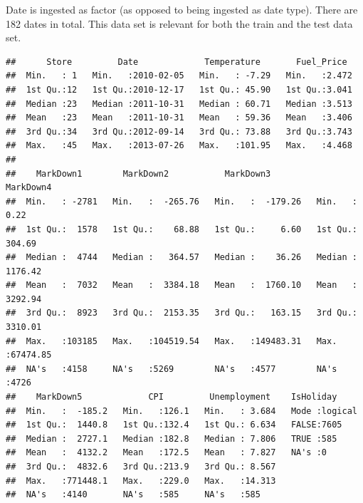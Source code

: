 \documentclass[]{article}
\newenvironment{Shaded}{\begin{snugshade}}{\end{snugshade}}
\newcommand{\KeywordTok}[1]{\textcolor[rgb]{0.13,0.29,0.53}{\textbf{{#1}}}}
\newcommand{\StringTok}[1]{\textcolor[rgb]{0.31,0.60,0.02}{{#1}}}
\newcommand{\NormalTok}[1]{{#1}}
\begin{document}
Date is ingested as factor (as opposed to being ingested as date type).
There are 182 dates in total. This data set is relevant for both the
train and the test data set.

\begin{Shaded}
\end{Shaded}

\begin{verbatim}
##      Store         Date             Temperature       Fuel_Price   
##  Min.   : 1   Min.   :2010-02-05   Min.   : -7.29   Min.   :2.472  
##  1st Qu.:12   1st Qu.:2010-12-17   1st Qu.: 45.90   1st Qu.:3.041  
##  Median :23   Median :2011-10-31   Median : 60.71   Median :3.513  
##  Mean   :23   Mean   :2011-10-31   Mean   : 59.36   Mean   :3.406  
##  3rd Qu.:34   3rd Qu.:2012-09-14   3rd Qu.: 73.88   3rd Qu.:3.743  
##  Max.   :45   Max.   :2013-07-26   Max.   :101.95   Max.   :4.468  
##                                                                    
##    MarkDown1        MarkDown2           MarkDown3           MarkDown4       
##  Min.   : -2781   Min.   :  -265.76   Min.   :  -179.26   Min.   :    0.22  
##  1st Qu.:  1578   1st Qu.:    68.88   1st Qu.:     6.60   1st Qu.:  304.69  
##  Median :  4744   Median :   364.57   Median :    36.26   Median : 1176.42  
##  Mean   :  7032   Mean   :  3384.18   Mean   :  1760.10   Mean   : 3292.94  
##  3rd Qu.:  8923   3rd Qu.:  2153.35   3rd Qu.:   163.15   3rd Qu.: 3310.01  
##  Max.   :103185   Max.   :104519.54   Max.   :149483.31   Max.   :67474.85  
##  NA's   :4158     NA's   :5269        NA's   :4577        NA's   :4726      
##    MarkDown5             CPI         Unemployment    IsHoliday      
##  Min.   :  -185.2   Min.   :126.1   Min.   : 3.684   Mode :logical  
##  1st Qu.:  1440.8   1st Qu.:132.4   1st Qu.: 6.634   FALSE:7605     
##  Median :  2727.1   Median :182.8   Median : 7.806   TRUE :585      
##  Mean   :  4132.2   Mean   :172.5   Mean   : 7.827   NA's :0        
##  3rd Qu.:  4832.6   3rd Qu.:213.9   3rd Qu.: 8.567                  
##  Max.   :771448.1   Max.   :229.0   Max.   :14.313                  
##  NA's   :4140       NA's   :585     NA's   :585
\end{verbatim}
\end{document}
